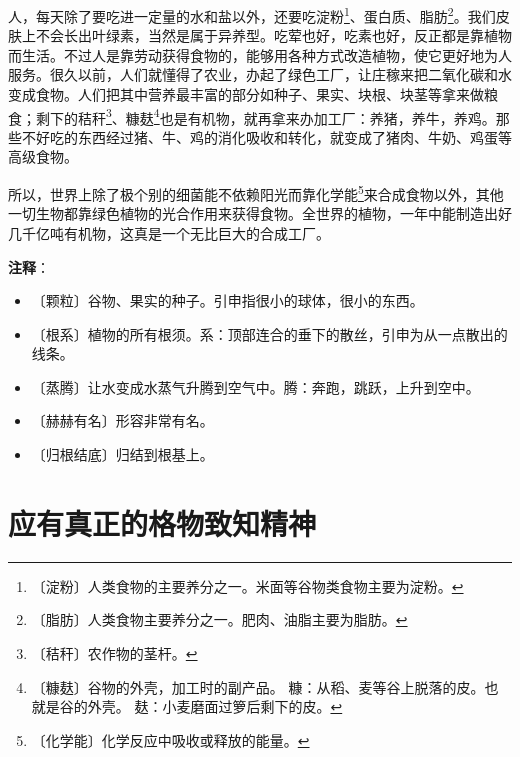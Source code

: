 \documentclass[12pt,UTF-8,openany]{ctexbook}
\begin{document}
\begin{large}
    人，每天除了要吃进一定量的水和盐以外，还要吃淀粉\footnote{〔淀粉〕人类食物的主要养分之一。米面等谷物类食物主要为淀粉。}、蛋白质、脂肪\footnote{〔脂肪〕人类食物主要养分之一。肥肉、油脂主要为脂肪。}。我们皮肤上不会长出叶绿素，当然是属于异养型。吃荤也好，吃素也好，反正都是靠植物而生活。不过人是靠劳动获得食物的，能够用各种方式改造植物，使它更好地为人服务。很久以前，人们就懂得了农业，办起了绿色工厂，让庄稼来把二氧化碳和水变成食物。人们把其中营养最丰富的部分如种子、果实、块根、块茎等拿来做粮食；剩下的秸秆\footnote{〔秸秆〕农作物的茎杆。}、糠麸\footnote{〔糠麸〕谷物的外壳，加工时的副产品。 糠：从稻、麦等谷上脱落的皮。也就是谷的外壳。 麸：小麦磨面过箩后剩下的皮。}也是有机物，就再拿来办加工厂：养猪，养牛，养鸡。那些不好吃的东西经过猪、牛、鸡的消化吸收和转化，就变成了猪肉、牛奶、鸡蛋等高级食物。
    
    所以，世界上除了极个别的细菌能不依赖阳光而靠化学能\footnote{〔化学能〕化学反应中吸收或释放的能量。}来合成食物以外，其他一切生物都靠绿色植物的光合作用来获得食物。全世界的植物，一年中能制造出好几千亿吨有机物，这真是一个无比巨大的合成工厂。
    
\end{large}


\newpage

\textbf{注释}：

\vspace{-1em}

\begin{itemize}
    \setlength\itemsep{-0.2em}
    \item 〔颗粒〕谷物、果实的种子。引申指很小的球体，很小的东西。
    \item 〔根系〕植物的所有根须。系：顶部连合的垂下的散丝，引申为从一点散出的线条。
    \item 〔蒸腾〕让水变成水蒸气升腾到空气中。腾：奔跑，跳跃，上升到空中。
    \item 〔赫赫有名〕形容非常有名。
    \item 〔归根结底〕归结到根基上。
\end{itemize}

\chapter{应有真正的格物致知精神}
\end{document}
